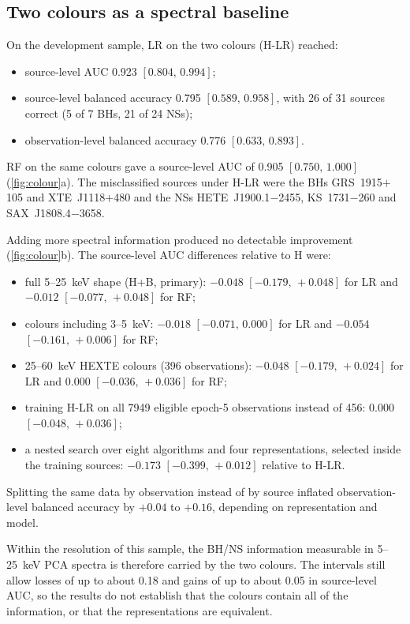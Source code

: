 \documentclass[11pt,a4paper]{article}
\newcommand{\ci}[2]{$[#1,\,#2]$}
\newcommand{\Hcol}{\textsf{H}}
\begin{document}
\subsection{Two colours as a spectral baseline}\label{sec:colour}
On the development sample, LR on the two colours (\Hcol-LR) reached:
\begin{itemize}\setlength\itemsep{1pt}
\item source-level AUC 0.923 \ci{0.804}{0.994};
\item source-level balanced accuracy 0.795 \ci{0.589}{0.958}, with 26 of 31 sources correct (5 of 7 BHs, 21 of 24 NSs);
\item observation-level balanced accuracy 0.776 \ci{0.633}{0.893}.
\end{itemize}
RF on the same colours gave a source-level AUC of 0.905 \ci{0.750}{1.000} (\cref{fig:colour}a). The misclassified
sources under \Hcol-LR were the BHs GRS~1915$+$105 and XTE~J1118$+$480 and the NSs HETE~J1900.1$-$2455, KS~1731$-$260 and
SAX~J1808.4$-$3658.

Adding more spectral information produced no detectable improvement (\cref{fig:colour}b). The source-level AUC
differences relative to \Hcol{} were:
\begin{itemize}\setlength\itemsep{1pt}
\item full 5--25~keV shape (\Hcol+B, primary): $-0.048$ \ci{-0.179}{+0.048} for LR and $-0.012$
\ci{-0.077}{+0.048} for RF;
\item colours including 3--5~keV: $-0.018$ \ci{-0.071}{0.000} for LR and $-0.054$ \ci{-0.161}{+0.006} for RF;
\item 25--60~keV HEXTE colours (396 observations): $-0.048$ \ci{-0.179}{+0.024} for LR and $0.000$
\ci{-0.036}{+0.036} for RF;
\item training \Hcol-LR on all 7949 eligible epoch-5 observations instead of 456: $0.000$ \ci{-0.048}{+0.036};
\item a nested search over eight algorithms and four representations, selected inside the training sources: $-0.173$
\ci{-0.399}{+0.012} relative to \Hcol-LR.
\end{itemize}
Splitting the same data by observation instead of by source inflated observation-level balanced accuracy by $+0.04$ to
$+0.16$, depending on representation and model.

Within the resolution of this sample, the BH/NS information measurable in 5--25~keV PCA spectra is therefore carried by
the two colours. The intervals still allow losses of up to about 0.18 and gains of up to about 0.05 in source-level AUC,
so the results do not establish that the colours contain all of the information, or that the representations are
equivalent.
\end{document}
